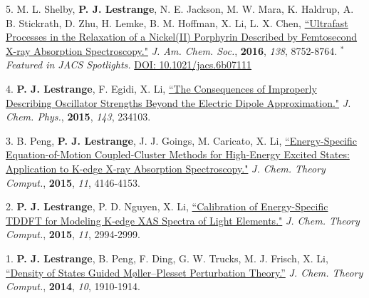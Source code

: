 \begin{cvpublications}

\cvpublication
{5.} 
{M. L. Shelby, \textbf{P. J. Lestrange}, N. E. Jackson, M. W. Mara, K. Haldrup, A. B. Stickrath, D. Zhu, H. Lemke, B. M. Hoffman, X. Li, L. X. Chen, \href{http://pubs.acs.org/doi/abs/10.1021/jacs.6b02176}{``Ultrafast Processes in the Relaxation of a Nickel(II) Porphyrin Described by Femtosecond X-ray Absorption Spectroscopy."} \textit{J. Am. Chem. Soc.}, \textbf{2016}, \textit{138}, 8752-8764. $^*$\textit{Featured in JACS Spotlights.} \href{http://pubs.acs.org/doi/abs/10.1021/jacs.6b07111}{DOI: 10.1021/jacs.6b07111}} 


\cvpublication
{4.} 
{\textbf{P. J. Lestrange}, F. Egidi, X. Li, \href{http://scitation.aip.org/content/aip/journal/jcp/143/23/10.1063/1.4937410}{``The Consequences of Improperly Describing Oscillator Strengths Beyond the Electric Dipole Approximation."} \textit{J. Chem. Phys.}, \textbf{2015}, \textit{143}, 234103.} 


\cvpublication
{3.} 
{B. Peng, \textbf{P. J. Lestrange}, J. J. Goings, M. Caricato, X. Li, \href{http://pubs.acs.org/doi/full/10.1021/acs.jctc.5b00459}{``Energy-Specific Equation-of-Motion Coupled-Cluster Methods for High-Energy Excited States: Application to K-edge X-ray Absorption Spectroscopy."} \textit{J. Chem. Theory Comput.}, \textbf{2015}, \textit{11}, 4146-4153.} 


\cvpublication
{2.} 
{\textbf{P. J. Lestrange}, P. D. Nguyen, X. Li, \href{http://pubs.acs.org/doi/abs/10.1021/acs.jctc.5b00169}{``Calibration of Energy-Specific TDDFT for Modeling K-edge XAS Spectra of Light Elements."} \textit{J. Chem. Theory Comput.}, \textbf{2015}, \textit{11}, 2994-2999.} 


\cvpublication
{1.} 
{\textbf{P. J. Lestrange}, B. Peng, F. Ding, G. W. Trucks, M. J. Frisch, X. Li, \href{http://pubs.acs.org/doi/abs/10.1021/ct400765a}{``Density of States Guided M{\o}ller--Plesset Perturbation Theory.''} \textit{J. Chem. Theory Comput.}, \textbf{2014}, \textit{10}, 1910-1914.} 


\end{cvpublications}
\vspace{-1cm}

